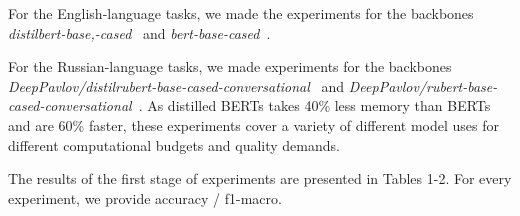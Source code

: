 \begin{table*}
 \caption{Metrics for five dialog tasks. Acc stands for accuracy, F1 stands for F1 score, mode S stands for single-task, and mode M stands for multi-task(with plain sampling). Averaged by three runs.}
 \label{tab:mtl_dialog}
\centering
{}
 
For the English-language tasks, we made the experiments for the backbones \textit{distilbert-base,-cased}~\cite{distilbert} and \textit{bert-base-cased}~\cite{bert}. %

For the Russian-language tasks, we made experiments for the backbones \textit{DeepPavlov/distilrubert-base-cased-conversational}~\cite{distilrubert} and \textit{DeepPavlov/rubert-base-cased-conversational}~\cite{rubert}. As distilled BERTs takes 40\% less memory than BERTs and are 60\% faster, these experiments cover a variety of different model uses for different computational budgets and quality demands. 

The results of the first stage of experiments are presented in Tables 1-2. For every experiment, we provide accuracy / f1-macro. 


\end{table*}
